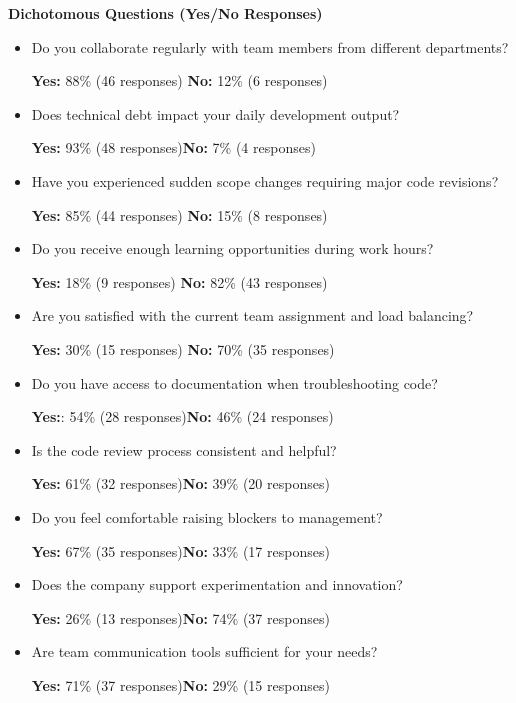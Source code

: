 \documentclass[12pt,a4paper,oneside]{book}
\begin{document}
\textbf{Dichotomous Questions (Yes/No Responses)}\\
\begin{itemize}
  \item Do you collaborate regularly with team members from different departments?
  
  \textbf{Yes:} 88\% (46 responses) \quad \textbf{No:} 12\% (6 responses)

  \item Does technical debt impact your daily development output?
  
  \textbf{Yes:} 93\% (48 responses)\quad \textbf{No:} 7\% (4 responses)

  \item Have you experienced sudden scope changes requiring major code revisions?
  
  \textbf{Yes:} 85\% (44 responses) \quad  \textbf{No:} 15\% (8 responses)
 
  \item Do you receive enough learning opportunities during work hours?
  
  \textbf{Yes:} 18\% (9 responses) \quad \textbf{No:} 82\% (43 responses)

  \item Are you satisfied with the current team assignment and load balancing?
  
  \textbf{Yes:} 30\% (15 responses) \quad \textbf{No:} 70\% (35 responses)

  \item Do you have access to documentation when troubleshooting code?
  
  \textbf{Yes:}: 54\% (28 responses)\quad \textbf{No:} 46\% (24 responses)

  \item Is the code review process consistent and helpful?
  
  \textbf{Yes:} 61\% (32 responses)\quad \textbf{No:} 39\% (20 responses)

  \item Do you feel comfortable raising blockers to management?
  
  \textbf{Yes:} 67\% (35 responses)\quad \textbf{No:} 33\% (17 responses)

  \item Does the company support experimentation and innovation?
  
  \textbf{Yes:} 26\% (13 responses)\quad \textbf{No:} 74\% (37 responses)

  \item Are team communication tools sufficient for your needs?
  
  \textbf{Yes:} 71\% (37 responses)\quad \textbf{No:} 29\% (15 responses)
\end{itemize}
\end{document}

